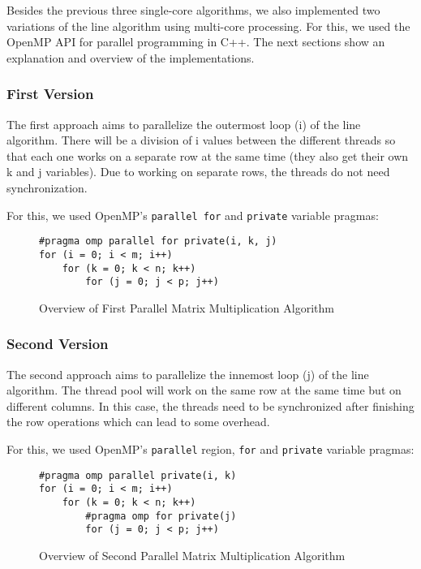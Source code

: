 Besides the previous three single-core algorithms, we also implemented two variations of the line algorithm using multi-core processing. For this, we used the OpenMP API for parallel programming in C++. The next sections show an explanation and overview of the implementations.

\subsubsection{First Version}

The first approach aims to parallelize the outermost loop (i) of the line algorithm. There will be a division of i values between the different threads so that each one works on a separate row at the same time (they also get their own k and j variables). Due to working on separate rows, the threads do not need synchronization.

For this, we used OpenMP's \verb#parallel for# and \verb#private# variable pragmas:

\begin{figure}[h!]
\begin{verbatim}
#pragma omp parallel for private(i, k, j)
for (i = 0; i < m; i++)
    for (k = 0; k < n; k++)
        for (j = 0; j < p; j++)
\end{verbatim}
\caption{Overview of First Parallel Matrix Multiplication Algorithm}
\label{fig:algo:parallel1}
\end{figure}

\subsubsection{Second Version}

The second approach aims to parallelize the innemost loop (j) of the line algorithm. The thread pool will work on the same row at the same time but on different columns. In this case, the threads need to be synchronized after finishing the row operations which can lead to some overhead.

For this, we used OpenMP's \verb#parallel# region, \verb#for# and \verb#private# variable pragmas:

\begin{figure}[h!]
\begin{verbatim}
#pragma omp parallel private(i, k)
for (i = 0; i < m; i++)
    for (k = 0; k < n; k++)
        #pragma omp for private(j)
        for (j = 0; j < p; j++)
\end{verbatim}
\caption{Overview of Second Parallel Matrix Multiplication Algorithm}
\label{fig:algo:parallel2}
\end{figure}
